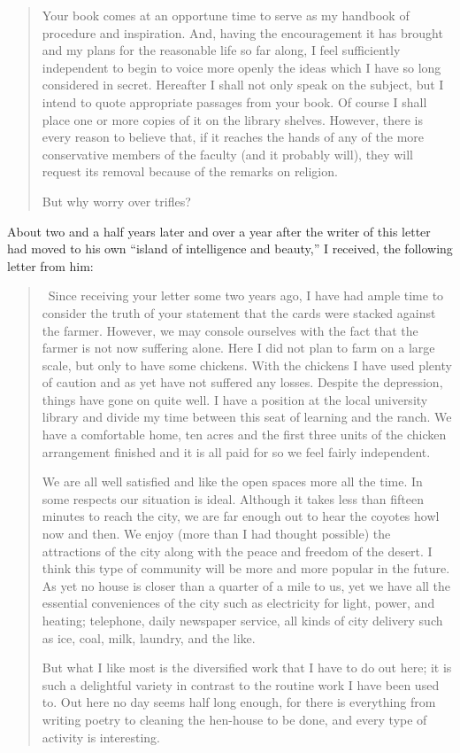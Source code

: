 \documentclass{book}
\begin{document}
\begin{quotation}
	Your book comes at an opportune time to serve as my handbook of procedure and inspiration. And, having the encouragement it has brought and my plans for the reasonable life so far along, I feel sufficiently independent to begin to voice more openly the ideas which I have so long considered in secret. Hereafter I shall not only speak on the subject, but I intend to quote appropriate passages from your book. Of course I shall place one or more copies of it on the library shelves. However, there is every reason to believe that, if it reaches the hands of any of the more conservative members of the faculty (and it probably will), they will request its removal because of the remarks on religion.

	But why worry over trifles?
\end{quotation}

About two and a half years later and over a year after the writer of this letter had moved to his own “island of intelligence and beauty,” I received, the following letter from him:

\begin{quotation}\
	Since receiving your letter some two years ago, I have had ample time to consider the truth of your statement that the cards were stacked against the farmer. However, we may console ourselves with the fact that the farmer is not now suffering alone. Here I did not plan to farm on a large scale, but only to have some chickens. With the chickens I have used plenty of caution and as yet have not suffered any losses. Despite the depression, things have gone on quite well. I have a position at the local university library and divide my time between this seat of learning and the ranch. We have a comfortable home, ten acres and the first three units of the chicken arrangement finished and it is all paid for so we feel fairly independent.

	We are all well satisfied and like the open spaces more all the time. In some respects our situation is ideal. Although it takes less than fifteen minutes to reach the city, we are far enough out to hear the coyotes howl now and then. We enjoy (more than I had thought possible) the attractions of the city along with the peace and freedom of the desert. I think this type of community will be more and more popular in the future. As yet no house is closer than a quarter of a mile to us, yet we have all the essential conveniences of the city such as electricity for light, power, and heating; telephone, daily newspaper service, all kinds of city delivery such as ice, coal, milk, laundry, and the like.

	But what I like most is the diversified work that I have to do out here; it is such a delightful variety in contrast to the routine work I have been used to. Out here no day seems half long enough, for there is everything from writing poetry to cleaning the hen-house to be done, and every type of activity is interesting.
\end{quotation}
\end{document}
